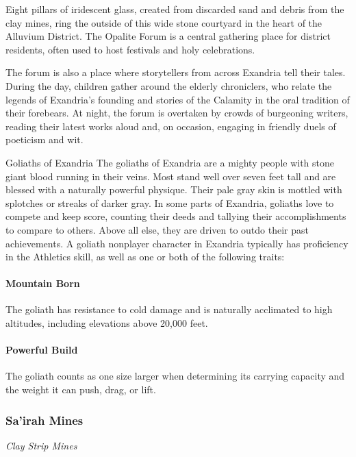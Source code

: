 \documentclass[letterpaper, 11pt, bg=full, twocolumn]{dndbook}
\begin{document}
Eight pillars of iridescent glass, created from discarded sand and debris from the clay mines, ring the outside of this wide stone courtyard in the heart of the Alluvium District. The Opalite Forum is a central gathering place for district residents, often used to host festivals and holy celebrations.

The forum is also a place where storytellers from across Exandria tell their tales. During the day, children gather around the elderly chroniclers, who relate the legends of Exandria's founding and stories of the Calamity in the oral tradition of their forebears. At night, the forum is overtaken by crowds of burgeoning writers, reading their latest works aloud and, on occasion, engaging in friendly duels of poeticism and wit.


\begin{DndSidebar}{Goliaths of Exandria}
The goliaths of Exandria are a mighty people with stone giant blood running in their veins. Most stand well over seven feet tall and are blessed with a naturally powerful physique. Their pale gray skin is mottled with splotches or streaks of darker gray.
In some parts of Exandria, goliaths love to compete and keep score, counting their deeds and tallying their accomplishments to compare to others. Above all else, they are driven to outdo their past achievements.
A goliath nonplayer character in Exandria typically has proficiency in the Athletics skill, as well as one or both of the following traits:
\paragraph{Mountain Born}

The goliath has resistance to cold damage and is naturally acclimated to high altitudes, including elevations above 20,000 feet.
\paragraph{Powerful Build}

The goliath counts as one size larger when determining its carrying capacity and the weight it can push, drag, or lift.
\end{DndSidebar}

\subsubsection{Sa'irah Mines}

\textit{Clay Strip Mines}
\end{document}
